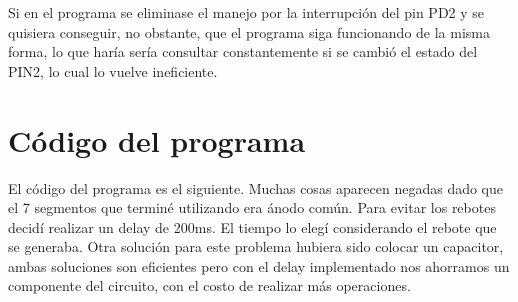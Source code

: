  Si en el programa se eliminase el manejo por la interrupción del pin PD2 y se quisiera
conseguir, no obstante, que el programa siga funcionando de la misma forma, lo que haría sería consultar constantemente si se cambió el estado del PIN2, lo cual lo vuelve ineficiente.

\section{Código del programa}
El código del programa es el siguiente. Muchas cosas aparecen negadas dado que el 7 segmentos que terminé utilizando era ánodo común.
Para evitar los rebotes decidí realizar un delay de 200ms. El tiempo lo elegí considerando el rebote que se generaba. Otra solución para este problema hubiera sido colocar un capacitor, ambas soluciones son eficientes pero con el delay implementado nos ahorramos un componente del circuito, con el costo de realizar más operaciones.

